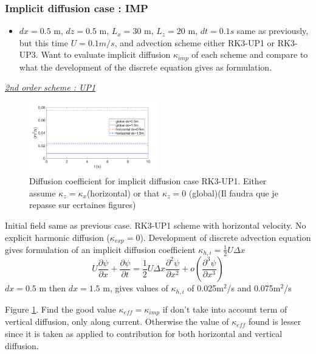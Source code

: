 \subsubsection{Implicit diffusion case : IMP}

\begin{itemize}
\item $dx=0.5$ m, $dz=0.5$ m, $L_x=30$ m, $L_z=20$ m, $dt=0.1s$ same as previously, but this time $U=0.1m/s$, and advection scheme either RK3-UP1 or RK3-UP3. Want to evaluate implicit diffusion $\kappa_{imp}$ of each scheme and compare to what the development of the discrete equation gives as formulation. 
\end{itemize}


\underline{\textit{2nd order scheme : UP1}}
\begin{figure}[h!]
\centering
\includegraphics[width=0.5\textwidth]{./CHAP_BPE/AGBPE_numlab3.png}
\caption{Diffusion coefficient for implicit diffusion case RK3-UP1. Either assume $\kappa_z=\kappa_x$(horizontal) or that $\kappa_z=0$ (global)\color{red}(Il faudra que je repasse sur ecrtaines figures)\color{black}}
\label{fig3numlab}
\end{figure}

Initial field same as previous case. RK3-UP1 scheme with horizontal velocity. No explicit harmonic diffusion ($\kappa_{exp}=0$). Development of discrete advection equation gives formulation of an implicit diffusion coefficient $\kappa_{h,i}=\frac{1}{2}U \Delta x$ 
\begin{equation}
U \frac{\partial \psi}{\partial x} +\frac{\partial \psi}{\partial t} = \frac{1}{2} U \Delta x  \frac{\partial^2 \psi}{\partial x^2} + o(\frac{\partial^3 \psi}{\partial x^3})
\end{equation}
$dx=0.5$ m then $dx=1.5$ m, gives values of $\kappa_{h,i}$ of 0.025m$^2$/s and 0.075m$^2$/s

Figure \ref{fig3numlab}. Find the good value $\kappa_{eff}=\kappa_{imp}$ if don't take into account term of vertical diffusion, only along current. Otherwise the value of $\kappa_{eff}$ found is lesser since it is taken as applied to contribution for both horizontal and vertical diffusion.

